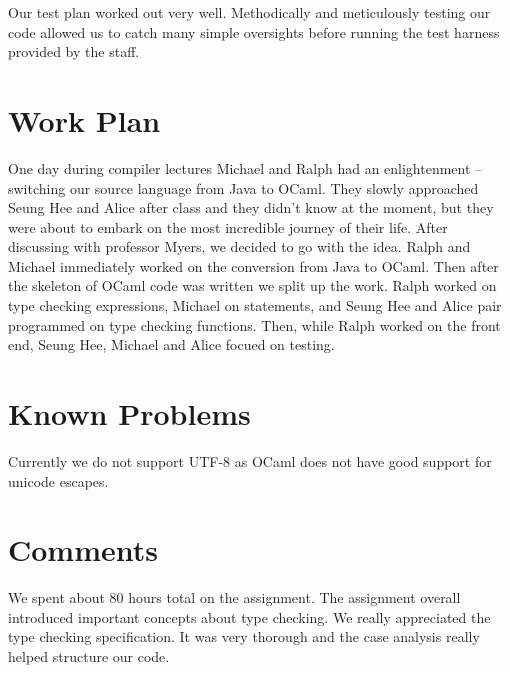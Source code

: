 \documentclass{hw}
\begin{document}
Our test plan worked out very well. Methodically and meticulously testing our code allowed us to catch many simple oversights before running the test harness provided by the staff.

\section{Work Plan}\label{sec:workplan}
One day during compiler lectures Michael and Ralph had an enlightenment -- switching our
source language from Java to OCaml.
They slowly approached Seung Hee and Alice after class and they didn't know at the moment,
but they were about to embark on the most incredible journey of their life. After discussing
with professor Myers, we decided to go with the idea. Ralph and Michael immediately
worked on the conversion from Java to OCaml. Then after the skeleton of OCaml code was written
we split up the work. Ralph worked on type checking expressions, Michael on statements,
and Seung Hee and Alice pair programmed on type checking functions. Then, while
Ralph worked on the front end, Seung Hee, Michael and Alice focued on testing.

\section{Known Problems}\label{sec:problems}
Currently we do not support UTF-8 as OCaml does not have good support for unicode
escapes.

\section{Comments}\label{sec:comments}
We spent about 80 hours total on the assignment. The assignment overall
introduced important concepts about type checking. We really appreciated
the type checking specification. It was very thorough and the case analysis
really helped structure our code.
\end{document}
